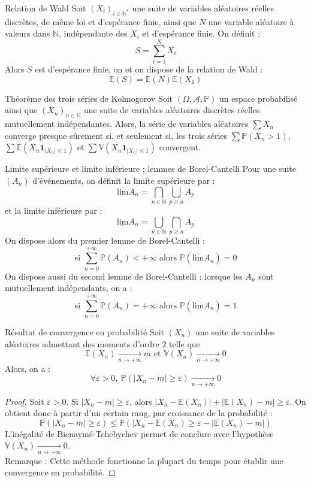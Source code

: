 \documentclass[french]{article}
\renewcommand{\P}{\mathbb{P}}
\newcommand{\N}{\mathbb{N}}
\newcommand{\st}{^*}
\newcommand{\E}{\mathbb{E}}
\newcommand{\V}{\mathbb{V}}
\theoremstyle{definition}
\begin{document}
\begin{lem}{Relation de Wald}
	Soit $(X_i)_{i\in\N\st}$ une suite de variables aléatoires réelles discrètes, de même loi et d'espérance finie, ainsi que $N$ une variable aléatoire à valeurs dans $\N$, indépendante des $X_i$ et d'espérance finie. On définit : $$S=\sum_{i=1}^{N}X_i$$ Alors $S$ est d'espérance finie, on et on dispose de la relation de Wald : $$\E(S)=\E(N)\E(X_1)$$
\end{lem}

\begin{lem}{Théorème des trois séries de Kolmogorov}
	Soit $(\Omega,\mathcal{A},\P)$ un espace probabilisé ainsi que $(X_n)_{n\in\N}$ une suite de variables aléatoires discrètes réelles mutuellement indépendantes. Alors, la série de variables aléatoires $\sum X_n$ converge presque sûrement si, et seulement si, les trois séries $\sum \P(X_n >1)$, $\sum \E(X_n\mathbf{1}_{\lvert X_n\rvert\leqslant 1})$ et $\sum \V(X_n\mathbf{1}_{\lvert X_n\rvert\leqslant 1})$ convergent.
\end{lem}

\begin{lem}{Limite supérieure et limite inférieure ; lemmes de Borel-Cantelli} Pour une suite $(A_n)$ d'événements, on définit la limite supérieure par : $$\overline{\text{lim}}A_n=\bigcap_{n\in\N}\bigcup_{p\geqslant n}A_p$$ et la limite inférieure par : $$\underline{\text{lim}}A_n=\bigcup_{n\in\N}\bigcap_{p\geqslant n}A_p$$ On dispose alors du premier lemme de Borel-Cantelli : $$\text{si }\sum_{n=0}^{+\infty}\P(A_n)<+\infty\text{ alors }\P(\overline{\text{lim}}A_n)=0$$ On dispose aussi du second lemme de Borel-Cantelli : lorsque les $A_n$ sont mutuellement indépendants, on a : $$\text{si }\sum_{n=0}^{+\infty}\P(A_n)=+\infty\text{ alors }\P(\overline{\text{lim}}A_n)=1$$
\end{lem}

\begin{lem}{Résultat de convergence en probabilité} Soit $(X_n)$ une suite de variables aléatoires admettant des moments d'ordre $2$ telle que $$\E(X_n)\xrightarrow[n\to+\infty]{}m\text{  et  }\V(X_n)\xrightarrow[n\to+\infty]{}0$$ Alors, on a : $$\forall \varepsilon>0,\ \P(\lvert X_n-m\rvert\geqslant\varepsilon)\xrightarrow[n\to+\infty]{}0$$
\end{lem}
\begin{proof}Soit $\varepsilon>0$. Si $\lvert X_n-m\rvert\geqslant\varepsilon$, alors $\lvert X_n-\E(X_n)\rvert+\lvert\E(X_n)-m\rvert\geqslant\varepsilon$. On obtient donc à partir d'un certain rang, par croissance de la probabilité : $$\P(\lvert X_n-m\rvert\geqslant\varepsilon)\leqslant\P(\lvert X_n-\E(X_n)\geqslant\varepsilon -\lvert\E(X_n)-m\rvert)$$ L'inégalité de Bienaymé-Tchebychev permet de conclure avec l'hypothèse $\V(X_n)\xrightarrow[n\to+\infty]{}0$. \\ Remarque : Cette méthode fonctionne la plupart du temps pour établir une convergence en probabilité.
\end{proof}
\end{document}
